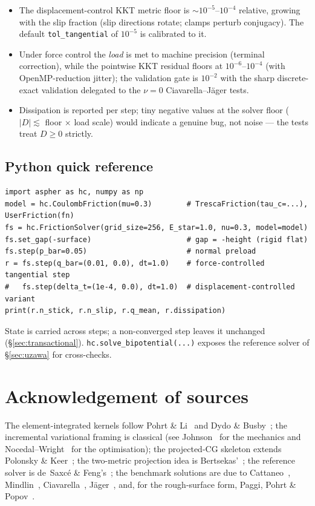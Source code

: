\documentclass[11pt,a4paper]{article}
\newcommand{\abs}[1]{\lvert#1\rvert}
\newcommand{\code}[1]{\texttt{#1}}
\begin{document}
\begin{itemize}
\item The displacement-control KKT metric floor is
  $\sim 10^{-5}$--$10^{-4}$ relative, growing with the slip fraction (slip
  directions rotate; clamps perturb conjugacy). The default
  \code{tol\_tangential} of $10^{-5}$ is calibrated to it.
\item Under force control the \emph{load} is met to machine precision
  (terminal correction), while the pointwise KKT residual floors at
  $10^{-6}$--$10^{-4}$ (with OpenMP-reduction jitter); the validation gate
  is $10^{-2}$ with the sharp discrete-exact validation delegated to the
  $\nu = 0$ Ciavarella--J\"ager tests.
\item Dissipation is reported per step; tiny negative values at the solver
  floor ($\abs{D} \lesssim$ floor $\times$ load scale) would indicate a
  genuine bug, not noise --- the tests treat $D \ge 0$ strictly.
\end{itemize}

\subsection{Python quick reference}

\begin{verbatim}
import aspher as hc, numpy as np
model = hc.CoulombFriction(mu=0.3)        # TrescaFriction(tau_c=...), UserFriction(fn)
fs = hc.FrictionSolver(grid_size=256, E_star=1.0, nu=0.3, model=model)
fs.set_gap(-surface)                      # gap = -height (rigid flat)
fs.step(p_bar=0.05)                       # normal preload
r = fs.step(q_bar=(0.01, 0.0), dt=1.0)    # force-controlled tangential step
#   fs.step(delta_t=(1e-4, 0.0), dt=1.0)  # displacement-controlled variant
print(r.n_stick, r.n_slip, r.q_mean, r.dissipation)
\end{verbatim}

State is carried across steps; a non-converged step leaves it unchanged
(\S\ref{sec:transactional}). \code{hc.solve\_bipotential(...)} exposes the
reference solver of \S\ref{sec:uzawa} for cross-checks.

\section*{Acknowledgement of sources}

The element-integrated kernels follow Pohrt \& Li~\cite{PohrtLi2014} and
Dydo \& Busby~\cite{DydoBusby1995}; the incremental variational framing is
classical (see Johnson~\cite{Johnson1985} for the mechanics and
Nocedal--Wright~\cite{NocWri2006} for the optimisation); the projected-CG
skeleton extends Polonsky \& Keer~\cite{PolKeer1999}; the two-metric
projection idea is Bertsekas'~\cite{Bertsekas1982}; the reference solver is
de~Saxc\'e \& Feng's~\cite{DeSaxceFeng1998}; the benchmark solutions are
due to Cattaneo~\cite{Cattaneo1938}, Mindlin~\cite{Mindlin1949},
Ciavarella~\cite{Ciavarella1998}, J\"ager~\cite{Jager1998}, and, for the
rough-surface form, Paggi, Pohrt \& Popov~\cite{PaggiPohrtPopov2014}.



\end{document}
